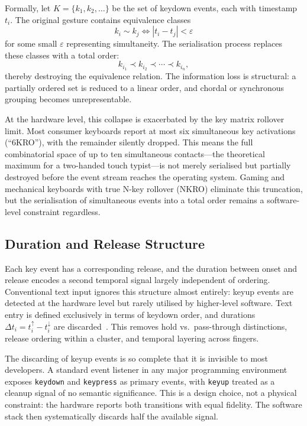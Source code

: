 \documentclass[11pt, a4paper]{article}
\begin{document}
Formally, let $K = \{k_1, k_2, \ldots\}$ be the set of keydown events,
each with timestamp $t_i$. The original gesture contains equivalence
classes
\[
  k_i \sim k_j \iff |t_i - t_j| < \varepsilon
\]
for some small $\varepsilon$ representing simultaneity. The serialisation
process replaces these classes with a total order:
\[
  k_{i_1} \prec k_{i_2} \prec \cdots \prec k_{i_n},
\]
thereby destroying the equivalence relation. The information loss is
structural: a partially ordered set is reduced to a linear order, and
chordal or synchronous grouping becomes unrepresentable.

At the hardware level, this collapse is exacerbated by the key matrix
rollover limit. Most consumer keyboards report at most six simultaneous
key activations (``6KRO''), with the remainder silently dropped. This
means the full combinatorial space of up to ten simultaneous contacts---the
theoretical maximum for a two-handed touch typist---is not merely
serialised but partially destroyed before the event stream reaches the
operating system. Gaming and mechanical keyboards with true N-key rollover
(NKRO) eliminate this truncation, but the serialisation of simultaneous
events into a total order remains a software-level constraint regardless.

\subsection{Duration and Release Structure}

Each key event has a corresponding release, and the duration between
onset and release encodes a second temporal signal largely independent of
ordering. Conventional text input ignores this structure almost entirely:
keyup events are detected at the hardware level but rarely utilised by
higher-level software. Text entry is defined exclusively in terms of
keydown order, and durations $\Delta t_i = t_i^{\uparrow} -
t_i^{\downarrow}$ are discarded~\cite{killourhy2009,monrose2000}. This
removes hold vs.\ pass-through distinctions, release ordering within a
cluster, and temporal layering across fingers.

The discarding of keyup events is so complete that it is invisible to
most developers. A standard event listener in any major programming
environment exposes \texttt{keydown} and \texttt{keypress} as primary
events, with \texttt{keyup} treated as a cleanup signal of no semantic
significance. This is a design choice, not a physical constraint: the
hardware reports both transitions with equal fidelity. The software stack
then systematically discards half the available signal.
\end{document}
